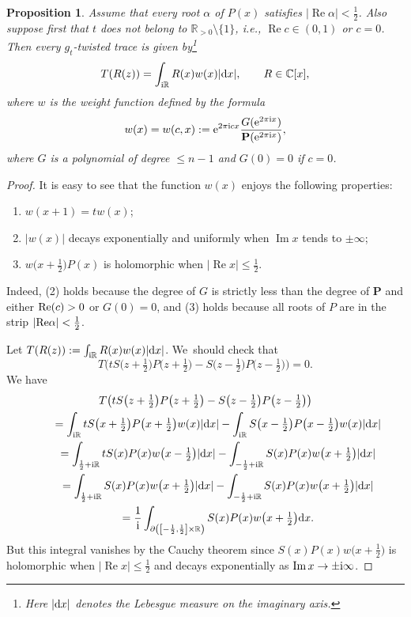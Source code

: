 \documentclass[pdftex]{sigma}
\newcommand{\RN}{\mathbb{R}} %
\renewcommand{\Im}{\mathop{\mathrm{Im}}\nolimits}
\renewcommand{\Re}{\operatorname{Re}}
\newcommand{\bP}{\mathbf{P}}
\newtheorem{Proposition}[Theorem]{Proposition}
\theoremstyle{definition}
\numberwithin{equation}{section}
\begin{document}
\begin{Proposition}\label{classtr}
\label{PropTracesForOpenStrip}
Assume that every root $\alpha$ of $P(x)$ satisfies $|\Re\alpha|<\frac{1}{2}$. Also suppose first that $t$ does not belong to $\RN_{>0}\setminus\{1\}$, i.e., $\Re c\in (0,1)$ or $c=0$. Then every $g_t$-twisted trace is given by\footnote{Here $|{\rm d}x|$ denotes the Lebesgue measure on the imaginary axis.}
\[
T(R(z))=\int_{{\rm i}\RN} R(x)w(x)|{\rm d}x|, \qquad R\in \mathbb C[x],
\]
 where $w$ is the {\it weight function} defined by the formula
 \[
 w(x)=w(c,x):={\rm e}^{2\pi {\rm i}cx}\frac{G({\rm e}^{2\pi {\rm i} x})}{\bP({\rm e}^{2\pi {\rm i} x})},
 \]
 where $G$ is a polynomial of degree $\le n-1$ and $G(0)=0$ if $c=0$.
\end{Proposition}
\begin{proof}
It is easy to see that the function $w(x)$ enjoys the following properties:
\begin{enumerate}\itemsep=0pt
\item[$(1)$]
$w(x+1)=tw(x)$;
\item[$(2)$]
$|w(x)|$ decays exponentially and uniformly when $\Im x$ tends to $\pm\infty$;
\item[$(3)$]
$w\big(x+\frac{1}{2}\big)P(x)$ is holomorphic when $|\Re x|\leq \frac{1}{2}$.
\end{enumerate}

Indeed, (2) holds because the degree of $G$ is strictly less than the degree of $\mathbf{P}$ and either ${\rm Re}(c)>0$ or $G(0)=0$, and (3) holds because all roots of $P$ are in the strip $|{\rm Re}\alpha|<\frac{1}{2}$.

Let $T(R(z)):=\int_{{\rm i}\RN} R(x)w(x)|{\rm d}x|$. We~should check that
\[
T\big(tS\big(z+\tfrac{1}{2}\big)P\big(z+\tfrac{1}{2}\big)-S\big(z-\tfrac{1}{2}\big)P\big(z-\tfrac{1}{2}\big)\big)=0.
\]
We have \begin{gather*}
T\big(tS\big(z+\tfrac{1}{2}\big)P\big(z+\tfrac{1}{2}\big)-S\big(z-\tfrac{1}{2}\big)
P\big(z-\tfrac{1}{2}\big)\big)
\\ \qquad
{}=\int_{{\rm i}\RN}tS\big(x+\tfrac{1}{2}\big)P\big(x+\tfrac{1}{2}\big)w(x)|{\rm d}x|-\int_{{\rm i}\RN}S\big(x-\tfrac{1}{2}\big)P\big(x-\tfrac{1}{2}\big)w(x)|{\rm d}x|
\\ \qquad
{}=\int_{\frac{1}{2}+{\rm i}\RN}tS(x)P(x)w\big(x-\tfrac{1}{2}\big)|{\rm d}x|-\int_{-\frac{1}{2}+{\rm i}\RN}S(x)P(x)w\big(x+\tfrac{1}{2}\big)|{\rm d}x|
\\ \qquad
{}=\int_{\frac{1}{2}+{\rm i}\RN}S(x)P(x)w\big(x+\tfrac{1}{2}\big)|{\rm d}x|-\int_{-\frac{1}{2}+{\rm i}\RN}S(x)P(x)w\big(x+\tfrac{1}{2}\big)|{\rm d}x|
\\ \qquad
{}=\frac{1}{{\rm i}}\int_{\partial \left(\left[-\frac{1}{2},\frac{1}{2}\right]\times \RN\right)}S(x)P(x)w\big(x+\tfrac{1}{2}\big){\rm d}x.
\end{gather*}
But this integral vanishes by the Cauchy theorem since $S(x)P(x)w\big(x+\tfrac{1}{2}\big)$ is holomorphic when $|\Re x|\leq \frac{1}{2}$ and decays exponentially as $\Im x\to\pm {\rm i}\infty$.


\end{proof}
\end{document}
